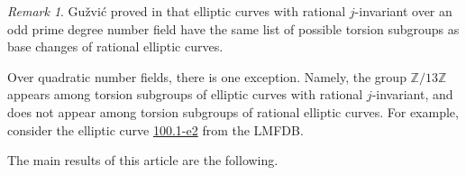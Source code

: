 \documentclass[10pt,leqno]{amsart}
\newcommand{\Z}{\mathbb{Z}}
\newcommand{\Q}{\mathbb{Q}}
\theoremstyle{definition}
\theoremstyle{remark}
\newtheorem{remark}[theorem]{Remark}
\numberwithin{theorem}{section}
\begin{document}
    







\begin{remark}
    Gu\v{z}vi\'{c} proved in \cite[Theorem 5.1.2]{guzvic2021torsion} that elliptic curves with rational $j$-invariant over an odd prime degree number field have the same list of possible torsion subgroups as base changes of rational elliptic curves. 
    
    Over quadratic number fields, there is one exception. Namely, the group $\Z/13\Z$ appears among torsion subgroups of elliptic curves with rational $j$-invariant, and does not appear among torsion subgroups of rational elliptic curves. For example, consider the elliptic curve \hyperlink{https://www.lmfdb.org/EllipticCurve/2.2.17.1/100.1/e/2}{100.1-e2} from the LMFDB.
\end{remark}


The main results of this article are the following.
\end{document}
